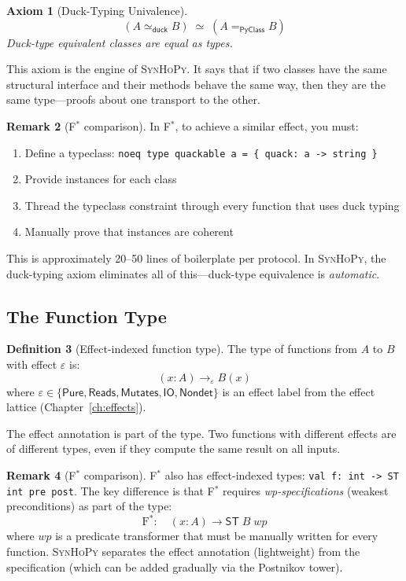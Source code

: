 \documentclass[11pt,a4paper]{report}
\theoremstyle{definition}
\newtheorem{definition}{Definition}[chapter]
\newtheorem{remark}[definition]{Remark}
\theoremstyle{plain}
\newtheorem{axiom_env}[definition]{Axiom}
\newcommand{\PyClass}{\mathsf{PyClass}}
\newcommand{\Pure}{\mathsf{Pure}}
\newcommand{\Reads}{\mathsf{Reads}}
\newcommand{\Mutates}{\mathsf{Mutates}}
\newcommand{\IO}{\mathsf{IO}}
\newcommand{\Nondet}{\mathsf{Nondet}}
\newcommand{\fstar}{F$^{*}$}
\newcommand{\fstarmath}{\text{F}^{*}}
\newcommand{\synhopy}{\textsc{SynHoPy}}
\begin{document}
\begin{axiom_env}[Duck-Typing Univalence]
\label{ax:duck-univalence}
\[
  (A \simeq_{\mathsf{duck}} B) \;\simeq\; (A =_{\PyClass} B)
\]
Duck-type equivalent classes are equal as types.
\end{axiom_env}

This axiom is the engine of \synhopy{}. It says that if two classes have the same
structural interface and their methods behave the same way, then they are the same
type---proofs about one transport to the other.

\begin{remark}[\fstar{} comparison]
In \fstar{}, to achieve a similar effect, you must:
\begin{enumerate}
  \item Define a typeclass: \lstinline[style=fstar]|noeq type quackable a = { quack: a -> string }|
  \item Provide instances for each class
  \item Thread the typeclass constraint through every function that uses duck typing
  \item Manually prove that instances are coherent
\end{enumerate}
This is approximately 20--50 lines of boilerplate per protocol. In \synhopy{},
the duck-typing axiom eliminates all of this---duck-type equivalence is
\emph{automatic}.
\end{remark}


\subsection{The Function Type}

\begin{definition}[Effect-indexed function type]
The type of functions from $A$ to $B$ with effect $\varepsilon$ is:
\[
  (x : A) \to_\varepsilon B(x)
\]
where $\varepsilon \in \{\Pure, \Reads, \Mutates, \IO, \Nondet\}$ is an effect
label from the effect lattice (Chapter~\ref{ch:effects}).
\end{definition}

The effect annotation is part of the type. Two functions with different effects
are of different types, even if they compute the same result on all inputs.

\begin{remark}[\fstar{} comparison]
\fstar{} also has effect-indexed types: \lstinline[style=fstar]{val f: int -> ST int pre post}.
The key difference is that \fstar{} requires \emph{wp-specifications} (weakest
preconditions) as part of the type:
\[
  \fstarmath: \quad (x : A) \to \mathsf{ST}\;B\;\mathit{wp}
\]
where $\mathit{wp}$ is a predicate transformer that must be manually written
for every function. \synhopy{} separates the effect annotation (lightweight) from
the specification (which can be added gradually via the Postnikov tower).
\end{remark}
\end{document}
